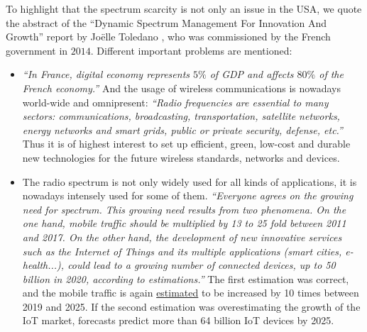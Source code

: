 To highlight that the spectrum scarcity is not only an issue in the USA,
we quote the abstract of the ``Dynamic Spectrum Management For Innovation And Growth'' report by Joëlle Toledano \cite{Toledano2014EnglishSummary,Toledano2014FrenchFull}, who was commissioned by the French government in $2014$.
Different important problems are mentioned:
%
\begin{itemize}\tightlist
    \item
    \emph{``In France, digital economy represents $5\%$ of GDP and affects $80\%$ of the French economy.''}
    And the usage of wireless communications is nowadays world-wide and omnipresent:
    \emph{``Radio frequencies are essential to many sectors: communications, broadcasting, transportation, satellite networks, energy networks and smart grids, public or private security, defense, etc.''}
    Thus it is of highest interest to set up efficient, green, low-cost and durable new technologies for the future wireless standards, networks and devices.
    \item
    The radio spectrum is not only widely used for all kinds of applications, it is nowadays intensely used for some of them.
    \emph{``Everyone agrees on the growing need for spectrum.
    This growing need results from two phenomena.
    On the one hand, mobile traffic should be multiplied by 13 to 25 fold between 2011 and 2017.
    On the other hand, the development of new innovative services such as the Internet of Things and its multiple applications (smart cities, e-health...), could lead to a growing number of connected devices, up to 50 billion in 2020, according to estimations.''}
    The first estimation was correct, and the mobile traffic is again \href{https://www.ericsson.com/en/mobility-report/future-mobile-data-usage-and-traffic-growth}{estimated} to be increased by 10 times between 2019 and 2025.
    If the second estimation was overestimating the growth of the IoT market, forecasts predict  more than 64 billion IoT devices by 2025.

\end{itemize}
